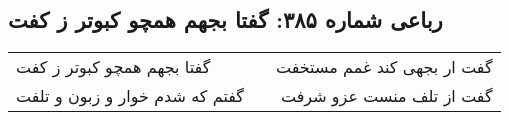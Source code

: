 \begin{center}
\section*{رباعی شماره ۳۸۵: گفتا بجهم همچو کبوتر ز کفت}
\label{sec:0385}
\begin{longtable}{l p{0.5cm} r}
گفتا بجهم همچو کبوتر ز کفت
&&
گفت ار بجهی کند غمم مستخفت
\\
گفتم که شدم خوار و زبون و تلفت
&&
گفت از تلف منست عزو شرفت
\\
\end{longtable}
\end{center}
